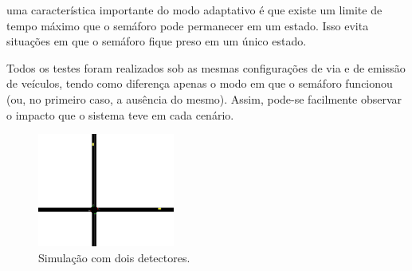 uma característica importante do modo adaptativo é que existe um limite de tempo máximo que o semáforo pode permanecer em um estado. Isso evita situações em que o semáforo fique preso em um único estado.

Todos os testes foram realizados sob as mesmas configurações de via e de emissão de veículos, tendo como diferença apenas o modo em que o semáforo funcionou (ou, no primeiro caso, a ausência do mesmo). Assim, pode-se facilmente observar o impacto que o sistema teve em cada cenário.

\begin{figure}[ht]
    \begin{center}
    \includegraphics[width=0.4\textwidth]{figuras/Simulation_4_Zoom.PNG}
    \end{center}
    \caption[Simulação com dois detectores veicular]{Simulação com dois detectores.}
    \label{simulationFour}
\end{figure}